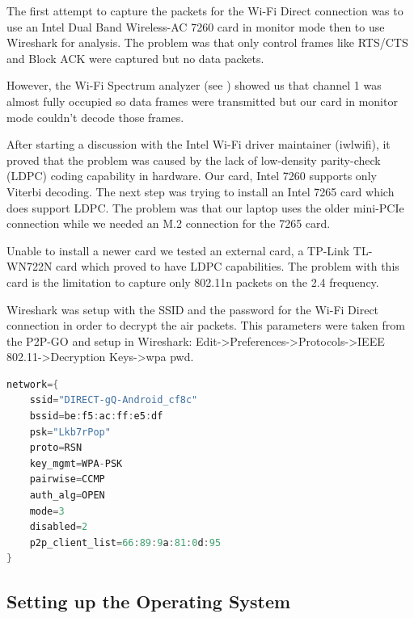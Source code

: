 The first attempt to capture the packets for the Wi-Fi Direct connection was to use an Intel Dual Band Wireless-AC 7260 card \cite{cite-intel7260} in monitor mode then to use Wireshark \cite{cite-wireshark}  for analysis. The problem was that only control frames like RTS/CTS and Block ACK were captured but no data packets.

However, the Wi-Fi Spectrum analyzer (see ) showed us that channel 1 was almost fully occupied so data frames were transmitted but our card in monitor mode couldn't decode those frames.


After starting a discussion \cite{cite-monitordiscussion} with the Intel Wi-Fi driver maintainer (iwlwifi), it proved that the problem was caused by the lack of low-density parity-check (LDPC) coding capability in hardware. Our card, Intel 7260 supports only Viterbi decoding. The next step was trying to install an Intel 7265 card which does support LDPC. The problem was that our laptop uses the older mini-PCIe connection while we needed an M.2 connection for the 7265 card.

Unable to install a newer card we tested an external card, a TP-Link TL-WN722N card \cite{cite-tplink} which proved to have LDPC capabilities. The problem with this card is the limitation to capture only 802.11n packets on the 2.4 frequency.

Wireshark was setup with the SSID and the password for the Wi-Fi Direct connection in order to decrypt the air packets. This parameters were taken from the P2P-GO and setup in Wireshark: Edit->Preferences->Protocols->IEEE 802.11->Decryption Keys->wpa pwd.

\begin{lstlisting}[language=C, frame=single, caption={Listing from /data/misc/wifi/p2p_supplicant.conf on the P2P GO},label=p2p_supplicant]
network={
	ssid="DIRECT-gQ-Android_cf8c"
	bssid=be:f5:ac:ff:e5:df
	psk="Lkb7rPop"
	proto=RSN
	key_mgmt=WPA-PSK
	pairwise=CCMP
	auth_alg=OPEN
	mode=3
	disabled=2
	p2p_client_list=66:89:9a:81:0d:95
}
\end{lstlisting}

\subsection{Setting up the Operating System}
\label{sub-sec:proj-scopenexus5operatingsystem}

